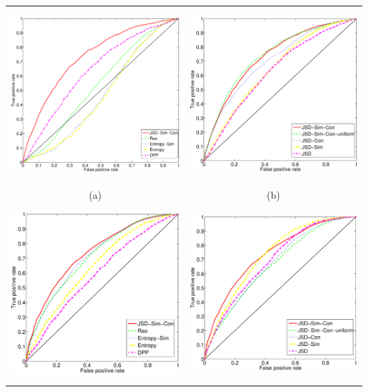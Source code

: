   
  \begin{table}[t]
\begin{center}
\begin{tabular}{CC}
\includegraphics[height=6.5cm]{figures/phonecases-comparison-new.eps}&\includegraphics[height=6.5cm]{figures/phonecases-breakdown-new.eps}\\
(a) & (b)\\
\includegraphics[height=6.5cm]{figures/nsf-comparison-new.eps}&\includegraphics[height=6.5cm]{figures/nsf-breakdown-new.eps}\\

\end{tabular}
\end{center}
\end{table}
